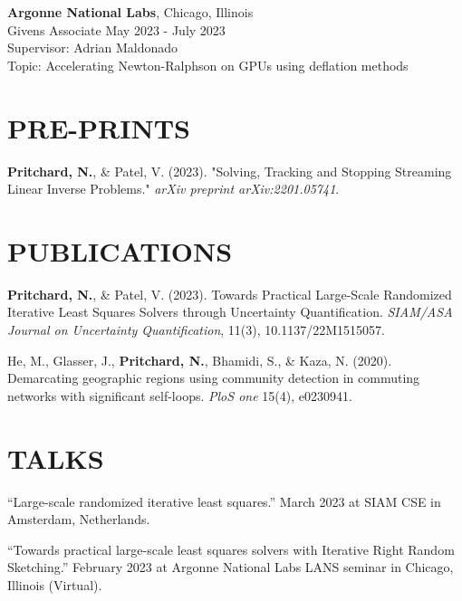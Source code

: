 \documentclass[margin,11pt]{res}
\def\nwp{\textbf{Pritchard, N.}}
\begin{document}
\begin{resume}
                {\bf Argonne National Labs}, \hfill Chicago, Illinois\\
                Givens Associate \hfill May 2023 - July 2023\\
                Supervisor: Adrian Maldonado\\
                Topic: Accelerating Newton-Ralphson on GPUs using deflation methods
\section{PRE-PRINTS}
\nwp, \& Patel, V. (2023). "Solving, Tracking and Stopping Streaming Linear Inverse Problems." \textit{arXiv preprint arXiv:2201.05741}.

\section{PUBLICATIONS}
\nwp, \& Patel, V. (2023). Towards Practical Large-Scale Randomized Iterative Least Squares Solvers through Uncertainty Quantification. \textit{SIAM/ASA Journal on Uncertainty Quantification}, 11(3), 10.1137/22M1515057. 

He, M., Glasser, J., \nwp, Bhamidi, S., \& Kaza, N. (2020). Demarcating geographic regions using community detection in commuting networks with significant self-loops. \textit{PloS one} 15(4), e0230941.



\section{TALKS}


``Large-scale randomized iterative least squares.'' March 2023 at SIAM CSE in Amsterdam, Netherlands.

``Towards practical large-scale least squares solvers with Iterative Right Random Sketching.'' February 2023 at Argonne National Labs LANS seminar in Chicago, Illinois (Virtual).


\end{resume}
\end{document}

